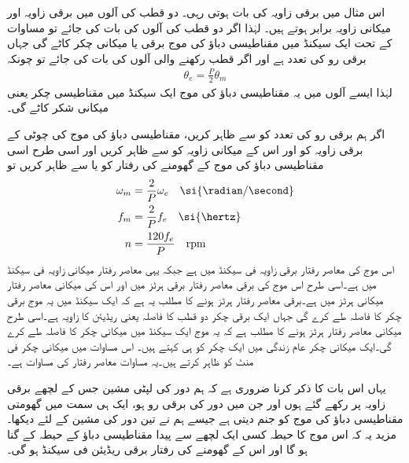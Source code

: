 اس مثال میں برقی زاویہ کی بات ہوتی رہی۔ دو قطب کی آلوں میں برقی زاویہ   اور میکانی زاویہ  برابر ہوتے ہیں۔ لہٰذا اگر دو قطب کی آلوں کی بات کی جائے تو مساوات  کے تحت ایک سیکنڈ میں مقناطیسی دباؤ کی موج  برقی یا میکانی چکر کاٹے گی جہاں  برقی رو کی تعدد ہے اور اگر  قطب رکھنے والی آلوں کی بات کی جائے تو چونکہ
\begin{align}
\theta_e=\frac{P}{2} \theta_m
\end{align}
لہٰذا ایسے آلوں میں یہ مقناطیسی دباؤ کی موج ایک سیکنڈ میں  مقناطیسی چکر یعنی  میکانی شکر کاٹے گی۔

اگر ہم برقی رو کی تعدد کو  سے ظاہر کریں، مقناطیسی دباؤ کی موج کی چوٹی کے برقی زاویہ کو   اور اس کے میکانی زاویہ کو  سے ظاہر کریں اور اسی طرح اسی مقناطیسی دباؤ کی موج کے گھومنے کی رفتار کو  یا  سے ظاہر کریں تو
\begin{gather}
\begin{aligned}
\omega_m&=\frac{2}{P} \omega_e \quad \si{\radian / \second}\\
f_m&=\frac{2}{P} f_e \quad \si{\hertz}\\
n&=\frac{120 f_e}{P} \quad \textup{rpm}
\end{aligned}
\end{gather}
 اس موج کی معاصر رفتار  برقی زاویہ فی سیکنڈ میں ہے جبکہ   یہی معاصر رفتار میکانی زاویہ فی سیکنڈ میں ہے۔اسی طرح  اس موج کی برقی  معاصر رفتار برقی ہرٹز میں اور  اس کی میکانی معاصر رفتار میکانی ہرٹز میں ہے۔برقی معاصر رفتار   ہرٹز ہونے کا مطلب یہ ہے کہ ایک سیکنڈ میں یہ موج  برقی چکر کا فاصلہ طے کرے گی جہاں ایک برقی چکر دو قطب کا فاصلہ یعنی   ریڈیئن کا زاویہ ہے۔اسی طرح میکانی معاصر رفتار  ہرٹز ہونے کا مطلب ہے کہ یہ موج ایک سیکنڈ میں  میکانی چکر کا فاصلہ طے کرے گی۔ایک میکانی چکر عام زندگی میں ایک چکر کو ہی کہتے ہیں۔ اس مساوات میں  میکانی چکر فی منٹ  کو ظاہر کرتے ہیں۔یہ مساوات معاصر رفتار کی مساوات ہے۔

یہاں اس بات کا ذکر کرنا ضروری ہے کہ ہم  دور کی لپٹی مشین جس کے لچھے  برقی زاویہ پر رکھے گئے ہوں اور جن میں  دور کی برقی رو  ہو، ایک ہی سمت میں گھومتی مقناطیسی دباؤ کی موج کو جنم دیتی ہے جیسے ہم نے تین دور کی مشین کے لئے دیکھا۔ مزید یہ کہ اس موج کا حیطہ کسی ایک لچھے سے پیدا مقناطیسی دباؤ کے حیطہ  کے   گنا ہو گا اور اس کے گھومنے کی رفتار  برقی ریڈیئن فی سیکنڈ ہو گی۔


